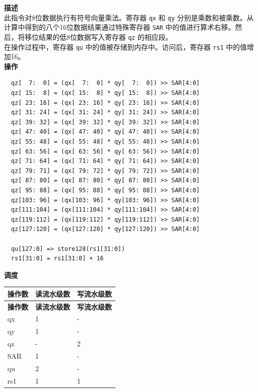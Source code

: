 \textbf{描述}\\
此指令对8位数据执行有符号向量乘法。寄存器 \lstinline{qx} 和 \lstinline{qy} 分别是乘数和被乘数。从计算中得到的八个16位数据结果通过特殊寄存器 \lstinline{SAR} 中的值进行算术右移。然后，将移位结果的低8位数据写入寄存器 \lstinline{qz} 的相应段。\\
在操作过程中，寄存器 \lstinline{qu} 中的值被存储到内存中。访问后，寄存器 \lstinline{rs1} 中的值增加16。\\
\textbf{操作}
\begin{lstlisting}
  qz[  7:  0] = (qx[  7:  0] * qy[  7:  0]) >> SAR[4:0]
  qz[ 15:  8] = (qx[ 15:  8] * qy[ 15:  8]) >> SAR[4:0]
  qz[ 23: 16] = (qx[ 23: 16] * qy[ 23: 16]) >> SAR[4:0]
  qz[ 31: 24] = (qx[ 31: 24] * qy[ 31: 24]) >> SAR[4:0]
  qz[ 39: 32] = (qx[ 39: 32] * qy[ 39: 32]) >> SAR[4:0]
  qz[ 47: 40] = (qx[ 47: 40] * qy[ 47: 40]) >> SAR[4:0]
  qz[ 55: 48] = (qx[ 55: 48] * qy[ 55: 48]) >> SAR[4:0]
  qz[ 63: 56] = (qx[ 63: 56] * qy[ 63: 56]) >> SAR[4:0]
  qz[ 71: 64] = (qx[ 71: 64] * qy[ 71: 64]) >> SAR[4:0]
  qz[ 79: 71] = (qx[ 79: 72] * qy[ 79: 72]) >> SAR[4:0]
  qz[ 87: 80] = (qx[ 87: 80] * qy[ 87: 80]) >> SAR[4:0]
  qz[ 95: 88] = (qx[ 95: 88] * qy[ 95: 88]) >> SAR[4:0]
  qz[103: 96] = (qx[103: 96] * qy[103: 96]) >> SAR[4:0]
  qz[111:104] = (qx[111:104] * qy[111:104]) >> SAR[4:0]
  qz[119:112] = (qx[119:112] * qy[119:112]) >> SAR[4:0]
  qz[127:120] = (qx[127:120] * qy[127:120]) >> SAR[4:0]

  qu[127:0] => store128(rs1[31:0])
  rs1[31:0] = rs1[31:0] + 16
\end{lstlisting}


\textbf{调度}\\
\begin{longtable}[c]{|l|l|l|}
    \hline
    \rowcolor{lightgray}
    \textbf{操作数} & \textbf{读流水级数} & \textbf{写流水级数} \\\hline
    \endfirsthead
    \hline
    \rowcolor{lightgray}
     \textbf{操作数} & \textbf{读流水级数} & \textbf{写流水级数} \\\hline
    \endhead
    \hline
    \endfoot

    qx & 1 & - \\\hline
  qy & 1 & - \\\hline
     qz & - & 2 \\\hline
    SAR & 1 & - \\\hline
    qu & 2 & - \\\hline
    rs1 & 1 & 1

\end{longtable}

